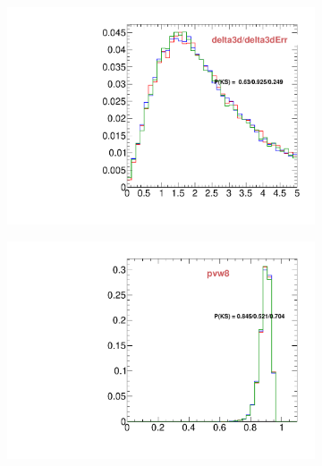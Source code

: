 \begin{figure}
\begin{subfigure}[b]{0.2\textwidth}
                \includegraphics[width=\textwidth]{Figures/VariablesComparison/Data_barrel_figs_3h/delta3dErr}
                \label{fig:Data_barrel_delta3d/delta3dErr_3h}
        \end{subfigure}
        \begin{subfigure}[b]{0.2\textwidth}
                \centering
                \includegraphics[width=\textwidth]{Figures/VariablesComparison/Data_barrel_figs_3h/pvw8}
                \label{fig:Data_barrel_pvw8_3h}
        \end{subfigure}
        \begin{subfigure}[b]{0.2\textwidth}
                \centering

\end{subfigure}
\end{figure}
